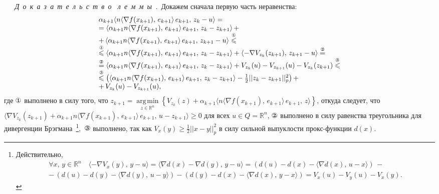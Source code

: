 \documentclass[11pt]{article}
\newcommand{\RR}{\mathbb{R}}
\newcommand{\argmin}{\mathop{\arg\!\min}}
\newcommand{\circledOne}{\text{\ding{172}}}
\newcommand{\circledTwo}{\text{\ding{173}}}
\newcommand{\circledThree}{\text{\ding{174}}}
\begin{document}
	
	\textsl{~~~Д~о~к~а~з~а~т~е~л~ь~с~т~в~о~\; л~е~м~м~ы~.}\,
	Докажем сначала первую часть неравенства:
	\begin{equation}\label{lem2:main_estimation}
		\begin{array}{l}
			\alpha_{k+1}\langle n \langle \nabla f(x_{k+1}), \, e_{k+1}\rangle \, e_{k+1}, \, z_{k}-u\rangle =\\
			= \langle \alpha_{k+1}n \langle \nabla f(x_{k+1}), \, e_{k+1}\rangle \, e_{k+1}, \,  z_{k}-z_{k+1}\rangle \, +\\ 
			+ \, \langle \alpha_{k+1}n \langle \nabla f(x_{k+1}), \, e_{k+1}\rangle \, e_{k+1}, \,  z_{k+1}-u\rangle \overset{\circledOne}{\leqslant}\\
			\overset{\circledOne}{\leqslant} \langle \alpha_{k+1}n \langle \nabla f(x_{k+1}), \, e_{k+1}\rangle \, e_{k+1}, \,  z_{k}-z_{k+1}\rangle + \langle -\nabla V_{z_k}(z_{k+1}), \, z_{k+1}-u\rangle \overset{\circledTwo}{=}\\
			\overset{\circledTwo}{=} \langle \alpha_{k+1}n \langle \nabla f(x_{k+1}), \, e_{k+1}\rangle \, e_{k+1}, \, z_{k}-z_{k+1}\rangle + V_{z_k}(u) - V_{z_{k+1}}(u) - V_{z_k}(z_{k+1}) \overset{\circledThree}{\leqslant}\\
			\overset{\circledThree}{\leqslant} \left(\langle \alpha_{k+1}n \langle \nabla f(x_{k+1}), \, e_{k+1}\rangle \, e_{k+1}, \,  z_{k}-z_{k+1}\rangle - \frac{1}{2}||z_k-z_{k+1}||_p^2\right) +\\ 
			+ \, V_{z_k}(u) - V_{z_{k+1}}(u),
		\end{array}
	\end{equation}
	где $\circledOne$ выполнено в силу того, что $z_{k+1} = \argmin\limits_{z\in \RR^n}\left\{V_{z_k}(z) +  \alpha_{k+1}\langle n \langle \nabla f(x_{k+1}), \, e_{k+1}\rangle \, e_{k+1}, \, z\rangle\right\}$, откуда следует, что $\langle \nabla V_{z_k}(z_{k+1}) +  \alpha_{k+1} n \langle \nabla f(x_{k+1}), \, e_{k+1}\rangle \, e_{k+1}, \, u - z_{k+1}\rangle \geqslant 0$ для всех $u\in Q=\RR^n$, $\circledTwo$ выполнено в силу равенства треугольника для дивергенции Брэгмана~\footnote{Действительно, \begin{equation*}
			\begin{array}{rl}
				\forall x, \, y \in \RR^n\quad \langle -\nabla V_x(y), \, y-u\rangle = \langle\nabla d(x) - \nabla d(y), \, y-u\rangle = (d(u) - d(x) - \langle\nabla d(x), \, u-x\rangle ) \, -\\
				- \, (d(u) - d(y) - \langle\nabla d(y), \, u-y\rangle ) - (d(y) - d(x) - \langle\nabla d(x), \, y-x\rangle ) = V_x(u)-V_y(u)-V_x(y).
			\end{array}
		\end{equation*}}, $\, \circledThree$ выполнено, так как $V_x(y) \geqslant \frac{1}{2}||x-y||_p^2$ в силу сильной выпуклости прокс-функции $d(x)$.
		
\end{document}
